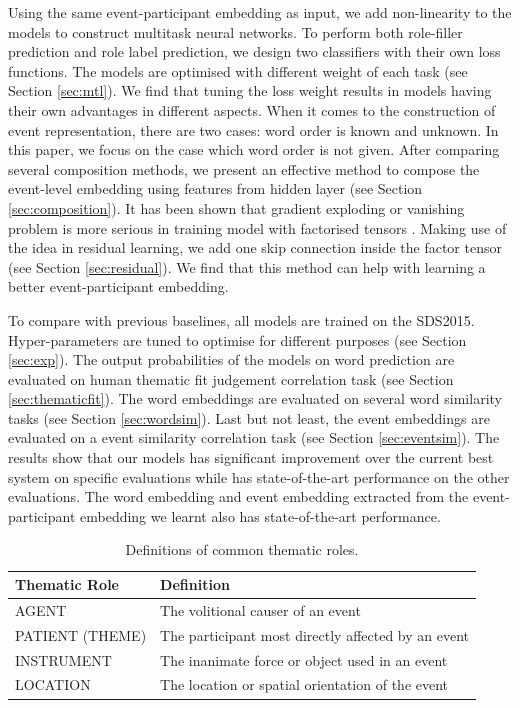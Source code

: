 \documentclass[a4paper]{article}
\begin{document}
Using the same event-participant embedding as input, we add non-linearity to the models to construct multitask neural networks. To perform both role-filler prediction and role label prediction, we design two classifiers with their own loss functions. The models are optimised with different weight of each task (see Section \ref{sec:mtl}). We find that tuning the loss weight results in models having their own advantages in different aspects. When it comes to the construction of event representation, there are two cases: word order is known and unknown. In this paper, we focus on the case which word order is not given. After comparing several composition methods, we present an effective method to compose the event-level embedding using features from hidden layer (see Section \ref{sec:composition}). It has been shown that gradient exploding or vanishing problem is more serious in training model with factorised tensors \citep{sutskever2011generating}.  Making use of the idea in residual learning, we add one skip connection inside the factor tensor (see Section \ref{sec:residual}). We find that this method can help with learning a better event-participant embedding.

To compare with previous baselines, all models are trained on the SDS2015. Hyper-parameters are tuned to optimise for different purposes (see Section \ref{sec:exp}). The output probabilities of the models on word prediction are evaluated on human thematic fit judgement correlation task (see Section \ref{sec:thematicfit}). The word embeddings are evaluated on several word similarity tasks (see Section \ref{sec:wordsim}). Last but not least, the event embeddings are evaluated on a event similarity correlation task (see Section \ref{sec:eventsim}). The results show that our models has significant improvement over the current best system on specific evaluations while has state-of-the-art performance on the other evaluations. The word embedding and event embedding extracted from the event-participant embedding we learnt also has state-of-the-art performance. 


\begin{table}[t]
\centering
\begin{tabular}{l|l}
\textbf{Thematic Role}  &   \textbf{Definition} \\ \hline
AGENT                   &   The volitional causer of an event \\
PATIENT (THEME)         &   The participant most directly affected by an event \\
INSTRUMENT              &   The inanimate force or object used in an event \\
LOCATION                &   The location or spatial orientation of the event \\
\end{tabular}
\caption{\label{tab:thematic} Definitions of common thematic roles.}
\end{table}
\end{document}
